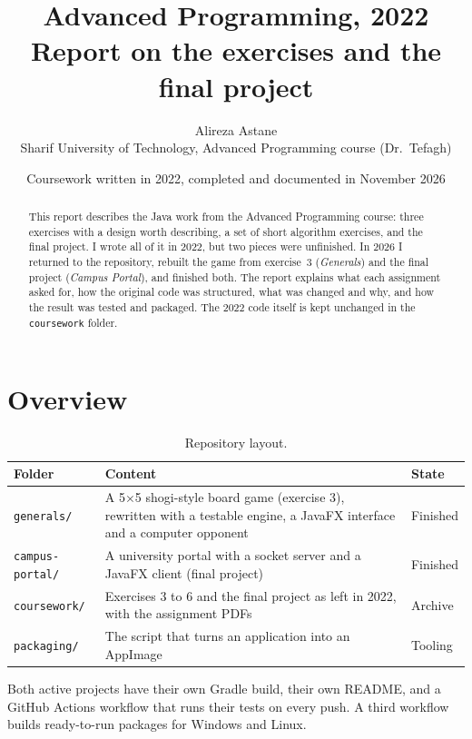 \documentclass[11pt,a4paper]{article}
\title{\textbf{Advanced Programming, 2022}\\[4pt]
\large Report on the exercises and the final project}
\author{Alireza Astane\\[2pt]
\small Sharif University of Technology, Advanced Programming course (Dr.\ Tefagh)}
\date{Coursework written in 2022, completed and documented in November 2026}
\begin{document}
\maketitle

\begin{abstract}
\noindent
This report describes the Java work from the Advanced Programming course: three exercises with a design worth describing, a set of short algorithm exercises, and the final project. I wrote all of it in 2022, but two pieces were unfinished. In 2026 I returned to the repository, rebuilt the game from exercise~3 (\emph{Generals}) and the final project (\emph{Campus Portal}), and finished both. The report explains what each assignment asked for, how the original code was structured, what was changed and why, and how the result was tested and packaged. The 2022 code itself is kept unchanged in the \texttt{coursework} folder.
\end{abstract}

\tableofcontents
\newpage

\section{Overview}

\begin{table}[h]
\centering
\small
\begin{tabularx}{\textwidth}{@{}l X l@{}}
\toprule
\textbf{Folder} & \textbf{Content} & \textbf{State} \\
\midrule
\texttt{generals/} & A 5$\times$5 shogi-style board game (exercise 3), rewritten with a testable engine, a JavaFX interface and a computer opponent & Finished \\
\texttt{campus-portal/} & A university portal with a socket server and a JavaFX client (final project) & Finished \\
\texttt{coursework/} & Exercises 3 to 6 and the final project as left in 2022, with the assignment PDFs & Archive \\
\texttt{packaging/} & The script that turns an application into an AppImage & Tooling \\
\bottomrule
\end{tabularx}
\caption{Repository layout.}
\end{table}

Both active projects have their own Gradle build, their own README, and a GitHub Actions workflow that runs their tests on every push. A third workflow builds ready-to-run packages for Windows and Linux.
\end{document}
